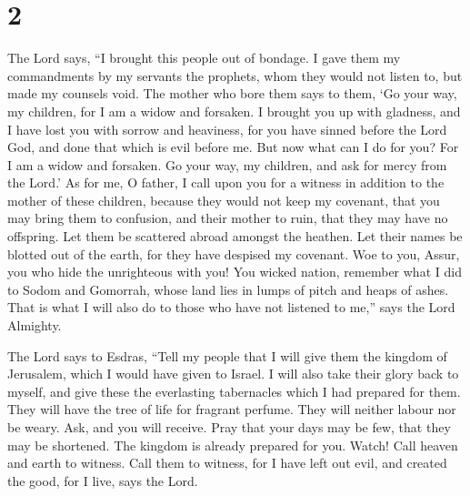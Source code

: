\hypertarget{section-1}{%
\section{2}\label{section-1}}

 The Lord says, ``I brought this people out of bondage. I
gave them my commandments by my servants the prophets, whom they would
not listen to, but made my counsels void.  The mother who
bore them says to them, `Go your way, my children, for I am a widow and
forsaken.  I brought you up with gladness, and I have lost
you with sorrow and heaviness, for you have sinned before the Lord God,
and done that which is evil before me.  But now what can I
do for you? For I am a widow and forsaken. Go your way, my children, and
ask for mercy from the Lord.'  As for me, O father, I call
upon you for a witness in addition to the mother of these children,
because they would not keep my covenant,  that you may bring
them to confusion, and their mother to ruin, that they may have no
offspring.  Let them be scattered abroad amongst the
heathen. Let their names be blotted out of the earth, for they have
despised my covenant.  Woe to you, Assur, you who hide the
unrighteous with you! You wicked nation, remember what I did to Sodom
and Gomorrah,  whose land lies in lumps of pitch and heaps
of ashes. That is what I will also do to those who have not listened to
me,'' says the Lord Almighty.

 The Lord says to Esdras, ``Tell my people that I will give
them the kingdom of Jerusalem, which I would have given to Israel.
 I will also take their glory back to myself, and give
these the everlasting tabernacles which I had prepared for them.
 They will have the tree of life for fragrant perfume. They
will neither labour nor be weary.  Ask, and you will
receive. Pray that your days may be few, that they may be shortened. The
kingdom is already prepared for you. Watch!  Call heaven
and earth to witness. Call them to witness, for I have left out evil,
and created the good, for I live, says the Lord.

